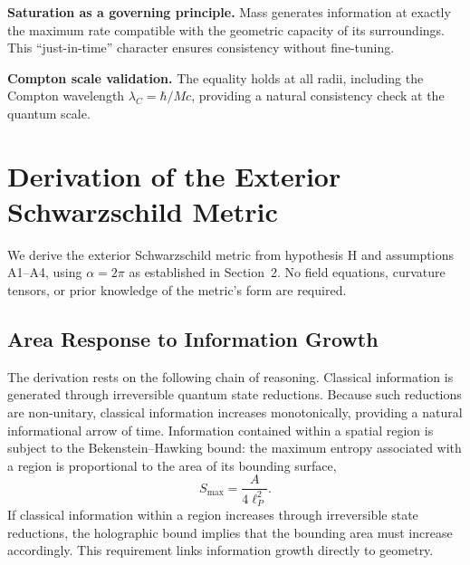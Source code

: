 \documentclass[12pt]{article}
\begin{document}
\medskip
\noindent\textbf{Saturation as a governing principle.}
Mass generates information at exactly the maximum rate compatible with
the geometric capacity of its surroundings.
This ``just-in-time'' character ensures consistency without fine-tuning.

\medskip
\noindent\textbf{Compton scale validation.}
The equality holds at all radii, including the Compton wavelength
$\lambda_C = \hbar/Mc$, providing a natural consistency check at the
quantum scale.

\section{Derivation of the Exterior Schwarzschild Metric}
\label{sec:schwarzschild}

We derive the exterior Schwarzschild metric from hypothesis H and
assumptions A1--A4, using $\alpha = 2\pi$ as established in Section~2.
No field equations, curvature tensors, or prior knowledge of the
metric's form are required.

\subsection{Area Response to Information Growth}
\label{sec:area-response}

The derivation rests on the following chain of reasoning.
Classical information is generated through irreversible quantum state
reductions.
Because such reductions are non-unitary, classical information
increases monotonically, providing a natural informational arrow of
time.
Information contained within a spatial region is subject to the
Bekenstein--Hawking bound: the maximum entropy associated with a
region is proportional to the area of its bounding surface,
\begin{equation}
  S_{\max} = \frac{A}{4\ell_P^2}.
  \label{eq:bekenstein-hawking}
\end{equation}
If classical information within a region increases through irreversible
state reductions, the holographic bound implies that the bounding area
must increase accordingly.
This requirement links information growth directly to geometry.
\end{document}
